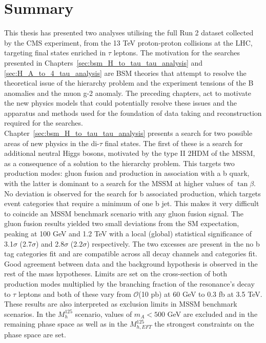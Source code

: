 \section{Summary}

This thesis has presented two analyses utilising the full Run 2 dataset collected by the \ac{CMS} experiment, from the 13 TeV proton-proton collisions at the \ac{LHC}, targeting final states enriched in $\tau$ leptons.
The motivation for the searches presented in Chapters~\ref{sec:bsm_H_to_tau_tau_analysis} and \ref{sec:H_A_to_4_tau_analysis} are \ac{BSM} theories that attempt to resolve the theoretical issue of the hierarchy problem and the experiment tensions of the B anomalies and the muon g-2 anomaly.
The preceding chapters, act to motivate the new physics models that could potentially resolve these issues and the apparatus and methods used for the foundation of data taking and reconstruction required for the searches. \\

Chapter~\ref{sec:bsm_H_to_tau_tau_analysis} presents a search for two possible areas of new physics in the di-$\tau$ final states.
The first of these is a search for additional neutral Higgs bosons, motivated by the type II \ac{2HDM} of the \ac{MSSM}, as a consequence of a solution to the hierarchy problem.
This targets two production modes: gluon fusion and production in association with a b quark, with the latter is dominant to a search for the \ac{MSSM} at higher values of $\tan\beta$.
No deviation is observed for the search for b associated production, which targets event categories that require a minimum of one b jet.
This makes it very difficult to coincide an \ac{MSSM} benchmark scenario with any gluon fusion signal.
The gluon fusion results yielded two small deviations from the \ac{SM} expectation, peaking at 100 GeV and 1.2 TeV with a local (global) statistical significance of 3.1$\sigma$ (2.7$\sigma$) and 2.8$\sigma$ (2.2$\sigma$) respectively.
The two excesses are present in the no b tag categories fit and are compatible across all decay channels and categories fit.
Good agreement between data and the background hypothesis is observed in the rest of the mass hypotheses.
Limits are set on the cross-section of both production modes multiplied by the branching fraction of the resonance's decay to $\tau$ leptons and both of these vary from $\mathcal{O}$(10 pb) at 60 GeV to 0.3 fb at 3.5 TeV.
These results are also interpreted as exclusion limits in \ac{MSSM} benchmark scenarios.
In the $M_{h}^{125}$ scenario, values of $m_A < 500$ GeV are excluded and in the remaining phase space as well as in the $M_{h, EFT}^{125}$ the strongest constraints on the phase space are set. \\

